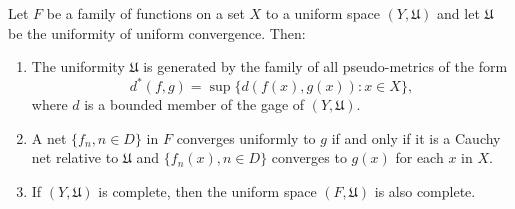 Let $F$ be a family of functions on a set $X$ to a uniform space $(Y, \mathfrak{U})$ and let $\mathfrak{U}$ be the uniformity of uniform convergence. Then:

\begin{enumerate}
\item[(a)] The uniformity $\mathfrak{U}$ is generated by the family of all pseudo-metrics of the form
$$d^*(f,g) = \sup \{d(f(x),g(x)) : x \in X\},$$
where $d$ is a bounded member of the gage of $(Y,\mathfrak{U})$.

\item[(b)] A net $\{f_n, n \in D\}$ in $F$ converges uniformly to $g$ if and only if it is a Cauchy net relative to $\mathfrak{U}$ and $\{f_n(x), n \in D\}$ converges to $g(x)$ for each $x$ in $X$.

\item[(c)] If $(Y,\mathfrak{U})$ is complete, then the uniform space $(F,\mathfrak{U})$ is also complete.
\end{enumerate}
